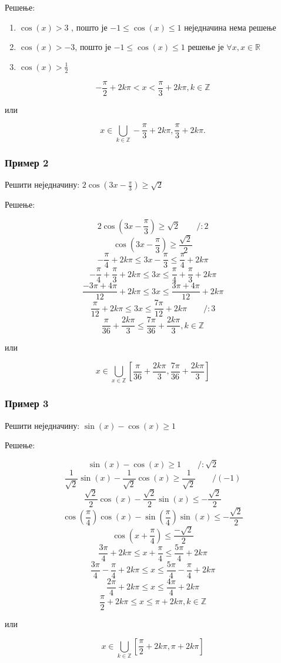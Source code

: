 \documentclass[a4paper,12pt]{article}
\begin{document}
Решење:

\begin{enumerate}[label=\alph*)]
\item $\cos(x)>3$ , пошто је $-1\leqslant\cos(x)\leqslant1$ неједначина нема решење
\item $\cos(x)>-3$, пошто је $-1\leqslant\cos(x)\leqslant1$ решење је $\forall x,x\in\mathbb{R}$
\item $\cos(x)>\frac{1}{2}$
\end{enumerate}

\[-\frac{\pi}{2}+2k\pi<x<\frac{\pi}{3}+2k\pi,k\in\mathbb{Z}\]
\centerline{или}
\[x\in\bigcup_{k\in\mathbb{Z}}-\frac{\pi}{3}+2k\pi,\frac{\pi}{3}+2k\pi.\]


\subsubsection{Пример 2}

Решити неједначину: $2\cos(3x-\frac{\pi}{3})\ge\sqrt{2}$

Решење:

\[2\cos\left(3x-\frac{\pi}{3}\right)\geq\sqrt{2}\qquad/:2\]
\[\cos\left(3x-\frac{\pi}{3}\right)\geqslant\frac{\sqrt{2}}{2}\]
\[-\frac{\pi}{4}+2k\pi\leq3x-\frac{\pi}{3}\leq\frac{\pi}{4}+2k\pi\]
\[-\frac{\pi}{4}+\frac{\pi}{3}+2k\pi\leq3x\leq\frac{\pi}{4}+\frac{\pi}{3}+2k\pi\]
\[\frac{-3\pi+4\pi}{12}+2k\pi\leq3x\leq\frac{3\pi+4\pi}{12}+2k\pi\]
\[\frac{\pi}{12}+2k\pi\leq3x\leq\frac{7\pi}{12}+2k\pi\qquad/:3\]
\[\frac{\pi}{36}+\frac{2k\pi}{3}\leqslant\frac{7\pi}{36}+\frac{2k\pi}{3},k\in\mathbb{Z}\]
\centerline{или}
\[x\in\bigcup_{x\in\mathbb{Z}}\left[\frac{\pi}{36}+\frac{2k\pi}{3},\frac{7\pi}{36}+\frac{2k\pi}{3}\right]\]

\subsubsection{Пример 3}

Решити неједначину: $\sin(x)-\cos(x)\ge1$

Решење:

\[\sin(x)-\cos(x)\geqslant1\qquad/:\sqrt{2}\]
\[\frac{1}{\sqrt{2}}\sin(x)-\frac{1}{\sqrt{2}}\cos(x)\geqslant\frac{1}{\sqrt{2}}\qquad/(-1)\]
\[\frac{\sqrt{2}}{2}\cos(x)-\frac{\sqrt{2}}{2}\sin(x)\leq-\frac{\sqrt{2}}{2}\]
\[\cos\left(\frac{\pi}{4}\right)\cos(x)-\sin\left(\frac{\pi}{4}\right)\sin(x)\leqslant-\frac{\sqrt{2}}{2}\]
\[\cos\left(x+\frac{\pi}{4}\right)\leq\frac{-\sqrt{2}}{2}\]
\[\frac{3\pi}{4}+2k\pi\leqslant x+\frac{\pi}{4}\leqslant\frac{5\pi}{4}+2k\pi\]
\[\frac{3\pi}{4}-\frac{\pi}{4}+2k\pi\leqslant x\leqslant\frac{5\pi}{4}-\frac{\pi}{4}+2k\pi\]
\[\frac{2\pi}{4}+2k\pi\leqslant x\leqslant\frac{4\pi}{4}+2k\pi\]
\[\frac{\pi}{2}+2k\pi\leqslant x\leqslant\pi+2k\pi,k\in\mathbb{Z}\]
\centerline{или}
\[x\in\bigcup_{k\in\mathbb{Z}}\left[\frac{\pi}{2}+2k\pi,\pi+2k\pi\right]\]
\end{document}
